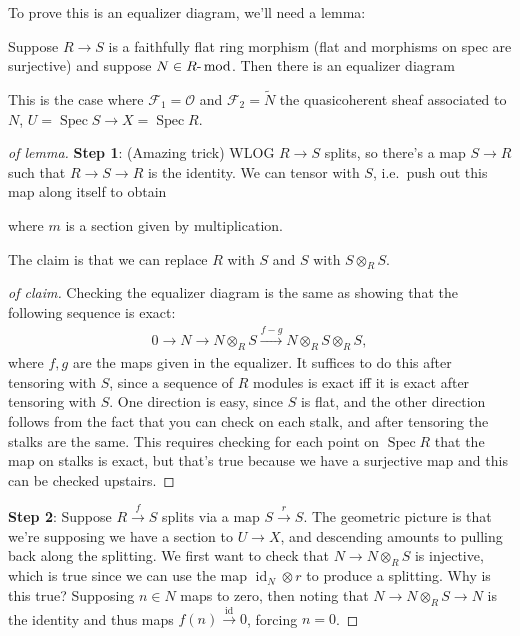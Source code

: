 To prove this is an equalizer diagram, we'll need a lemma:

\begin{lemma}[?]

Suppose \(R\to S\) is a faithfully flat ring morphism (flat and
morphisms on spec are surjective) and suppose
\(N\in {R{\hbox{-}}\operatorname{mod}}\). Then there is an equalizer
diagram

\end{lemma}

This is the case where \(\mathcal{F}_1 = {\mathcal{O}}\) and
\(\mathcal{F}_2 = \tilde N\) the quasicoherent sheaf associated to
\(N\), \(U = \operatorname{Spec}S \to X = \operatorname{Spec}R\).

\begin{proof}[of lemma]

\textbf{Step 1}: (Amazing trick) WLOG \(R\to S\) splits, so there's a
map \(S\to R\) such that \(R\to S\to R\) is the identity. We can tensor
with \(S\), i.e.~push out this map along itself to obtain

where \(m\) is a section given by multiplication.

\begin{claim}

The claim is that we can replace \(R\) with \(S\) and \(S\) with
\(S\otimes_R S\).

\end{claim}

\begin{proof}[of claim]

Checking the equalizer diagram is the same as showing that the following
sequence is exact:
\begin{align*}  
0 \to N \to N\otimes_R S \xrightarrow{f-g} N\otimes_R S\otimes_R S
,\end{align*}
where \(f, g\) are the maps given in the equalizer. It suffices to do
this after tensoring with \(S\), since a sequence of \(R\) modules is
exact iff it is exact after tensoring with \(S\). One direction is easy,
since \(S\) is flat, and the other direction follows from the fact that
you can check on each stalk, and after tensoring the stalks are the
same. This requires checking for each point on \(\operatorname{Spec}R\)
that the map on stalks is exact, but that's true because we have a
surjective map and this can be checked upstairs.

\end{proof}

\textbf{Step 2}: Suppose \(R\xrightarrow{f} S\) splits via a map
\(S\xrightarrow{r} S\). The geometric picture is that we're supposing we
have a section to \(U\to X\), and descending amounts to pulling back
along the splitting. We first want to check that \(N\to N\otimes_R S\)
is injective, which is true since we can use the map
\(\operatorname{id}_N \otimes r\) to produce a splitting. Why is this
true? Supposing \(n\in N\) maps to zero, then noting that
\(N\to N\otimes_R S \to N\) is the identity and thus maps
\(f(n)\xrightarrow{\operatorname{id}} 0\), forcing \(n=0\).


\end{proof}
